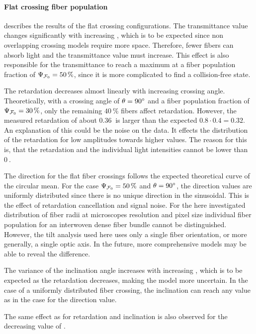 \paragraph{Flat crossing fiber population}
 describes the results of the flat crossing configurations.
The transmittance value changes significantly with increasing \modelOmega{}, which is to be expected since non overlapping crossing models require more space.
Therefore, fewer fibers can absorb light and the transmittance value must increase.
This effect is also responsible for the transmittance to reach a maximum at a fiber population fraction of $\textnormal{$\Psi_{\textnormal{$\mathcal{F}_0$}}$}=\SI{50}{\percent}$, since it is more complicated to find a collision-free state.
\par
%
The retardation decreases almost linearly with increasing crossing angle.
Theoretically, with a crossing angle of $\textnormal{$\theta$}=\SI{90}{\degree}$ and a fiber population fraction of $\textnormal{$\Psi_{\textnormal{$\mathcal{F}_0$}}$}=\SI{30}{\percent}$, only the remaining $\SI{40}{\percent}$ fibers affect retardation.
However, the measured retardation of about $\SI{0.36}{}$ is larger than the expected $0.8\cdot 0.4 = 0.32$.
An explanation of this could be the noise on the data.
It effects the distribution of the retardation for low amplitudes towards higher values.
The reason for this is, that the retardation and the individual light intensities cannot be lower than $\SI{0}{}$.
\par
%
The direction for the flat fiber crossings follows the expected theoretical curve of the circular mean.
For the case $\textnormal{$\Psi_{\textnormal{$\mathcal{F}_0$}}$}=\SI{50}{\percent}$ and $\textnormal{$\theta$}=\SI{90}{\degree}$, the direction values are uniformly distributed since there is no unique direction in the sinusoidal.
This is the effect of retardation cancellation and signal noise.
For the here investigated distribution of fiber radii at microscopes resolution and pixel size individual fiber population for an interwoven dense fiber bundle cannot be distinguished.
However, the tilt analysis used here uses only a single fiber orientation, or more generally, a single optic axis.
In the future, more comprehensive models may be able to reveal the difference.
\par
%
The variance of the inclination angle increases with increasing \modelOmega{}, which is to be expected as the retardation decreases, making the model more uncertain.
In the case of a uniformly distributed fiber crossing, the inclination can reach any value as in the case for the direction value.
\par
%
The same effect as for retardation and inclination is also observed for the decreasing value of \trel{}.
